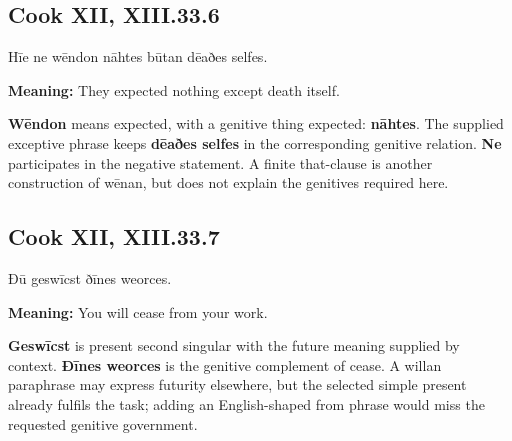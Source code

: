 \par\begin{minipage}{\linewidth}\raggedright
\subsection*{Cook XII, XIII.33.6}

Hīe ne wēndon nāhtes būtan dēaðes selfes.

\textbf{Meaning:} They expected nothing except death itself.

\textbf{Wēndon} means expected, with a genitive thing expected: \textbf{nāhtes}. The supplied exceptive phrase keeps \textbf{dēaðes selfes} in the corresponding genitive relation. \textbf{Ne} participates in the negative statement. A finite that-clause is another construction of wēnan, but does not explain the genitives required here.

\end{minipage}\par\addvspace{4pt}

\par\begin{minipage}{\linewidth}\raggedright
\subsection*{Cook XII, XIII.33.7}

Ðū geswīcst ðīnes weorces.

\textbf{Meaning:} You will cease from your work.

\textbf{Geswīcst} is present second singular with the future meaning supplied by context. \textbf{Ðīnes weorces} is the genitive complement of cease. A willan paraphrase may express futurity elsewhere, but the selected simple present already fulfils the task; adding an English-shaped from phrase would miss the requested genitive government.

\end{minipage}\par\addvspace{4pt}

